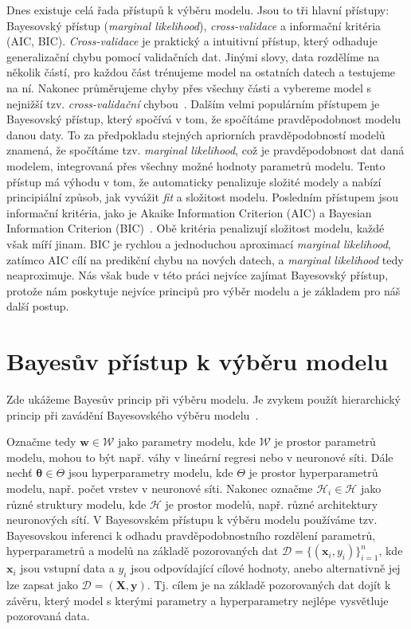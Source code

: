 Dnes existuje celá řada přístupů k výběru modelu.
Jsou to tři hlavní přístupy: Bayesovský přístup (\emph{marginal likelihood}), \emph{cross-validace} a informační kritéria (AIC, BIC).
\emph{Cross-validace} je praktický a intuitivní přístup, který odhaduje generalizační chybu pomocí validačních dat.
Jinými slovy, data rozdělíme na několik částí, pro každou část trénujeme model na ostatních datech a testujeme na ní.
Nakonec průměrujeme chyby přes všechny části a vybereme model s nejnižší tzv. \emph{cross-validační} chybou~\cite{rasmussen2006}.
Dalším velmi populárním přístupem je Bayesovský přístup, který spočívá v tom, že spočítáme pravděpodobnost modelu danou daty.
To za předpokladu stejných apriorních pravděpodobností modelů znamená, že spočítáme tzv. \emph{marginal likelihood}, což je pravděpodobnost dat daná modelem, integrovaná přes všechny možné hodnoty parametrů modelu.
Tento přístup má výhodu v tom, že automaticky penalizuje složité modely a nabízí principiální způsob, jak vyvážit \emph{fit} a složitost modelu.
Posledním přístupem jsou informační kritéria, jako je Akaike Information Criterion (AIC) a Bayesian Information Criterion (BIC)~\cite{bishop2006}.
Obě kritéria penalizují složitost modelu, každé však míří jinam.
BIC je rychlou a jednoduchou aproximací \emph{marginal likelihood}, zatímco AIC cílí na predikční chybu na nových datech, a \emph{marginal likelihood} tedy neaproximuje.
Nás však bude v této práci nejvíce zajímat Bayesovský přístup, protože nám poskytuje nejvíce principů pro výběr modelu a je základem pro náš další postup.

\section{Bayesův přístup k výběru modelu}
\label{sec:bayes-vyber}

Zde ukážeme Bayesův princip při výběru modelu.
Je zvykem použít hierarchický princip při zavádění Bayesovského výběru modelu~\cite{rasmussen2006}.
\par

Označme tedy $\mathbf{w} \in \mathcal{W}$ jako parametry modelu, kde $\mathcal{W}$ je prostor parametrů modelu, mohou to být např. váhy v lineární regresi nebo v neuronové síti.
Dále nechť $\boldsymbol{\theta} \in \Theta $ jsou hyperparametry modelu, kde $\Theta$ je prostor hyperparametrů modelu, např. počet vrstev v neuronové síti.
Nakonec označme $\mathcal{H}_i \in \mathcal{H}$ jako různé struktury modelu, kde $\mathcal{H}$ je prostor modelů, např. různé architektury neuronových sítí.
V Bayesovském přístupu k výběru modelu používáme tzv. Bayesovskou inferenci k odhadu pravděpodobnostního rozdělení parametrů, hyperparametrů a modelů na základě pozorovaných dat $\mathcal{D} = \{(\mathbf{x}_i, y_i)\}_{i=1}^n$, kde $\mathbf{x}_i$ jsou vstupní data a $y_i$ jsou odpovídající cílové hodnoty, anebo alternativně jej lze zapsat jako $\mathcal{D} = (\mathbf{X}, \mathbf{y})$.
Tj. cílem je na základě pozorovaných dat dojít k závěru, který model s kterými parametry a hyperparametry nejlépe vysvětluje pozorovaná data.
\par

